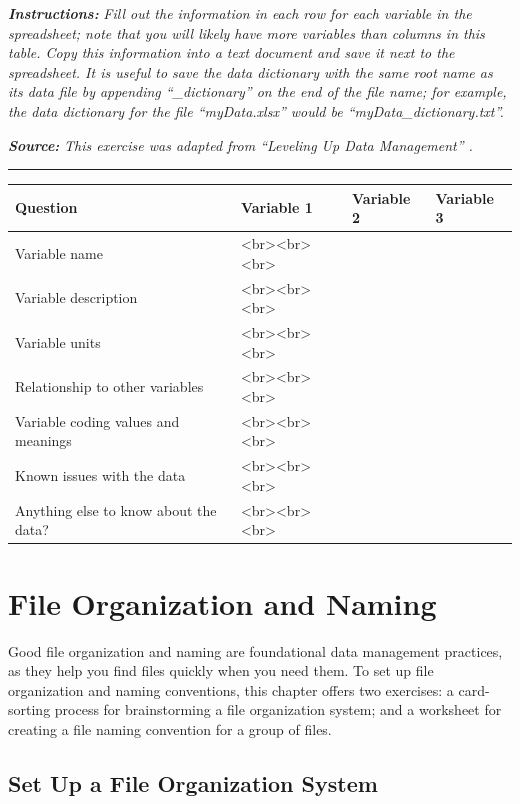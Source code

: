 \documentclass[
]{book}
\begin{document}
\textbf{\emph{Instructions:}} \emph{Fill out the information in each row for each variable in the spreadsheet; note that you will likely have more variables than columns in this table. Copy this information into a text document and save it next to the spreadsheet. It is useful to save the data dictionary with the same root name as its data file by appending ``\_dictionary'' on the end of the file name; for example, the data dictionary for the file ``myData.xlsx'' would be ``myData\_dictionary.txt''.}

\textbf{\emph{Source:}} \emph{This exercise was adapted from ``Leveling Up Data Management'' \citep{briney_leveling_2023}.}

\begin{center}\rule{0.5\linewidth}{0.5pt}\end{center}

\begin{tabular}{l|l|l|l}
\hline
Question & Variable 1 & Variable 2 & Variable 3\\
\hline
Variable name & <br><br><br> &  & \\
\hline
Variable description & <br><br><br> &  & \\
\hline
Variable units & <br><br><br> &  & \\
\hline
Relationship to other variables & <br><br><br> &  & \\
\hline
Variable coding values and meanings & <br><br><br> &  & \\
\hline
Known issues with the data & <br><br><br> &  & \\
\hline
Anything else to know about the data? & <br><br><br> &  & \\
\hline
\end{tabular}

\hypertarget{file-organization-and-naming}{%
\chapter{File Organization and Naming}\label{file-organization-and-naming}}

Good file organization and naming are foundational data management practices, as they help you find files quickly when you need them. To set up file organization and naming conventions, this chapter offers two exercises: a card-sorting process for brainstorming a file organization system; and a worksheet for creating a file naming convention for a group of files.

\hypertarget{file-organization}{%
\section{Set Up a File Organization System}\label{file-organization}}
\end{document}
